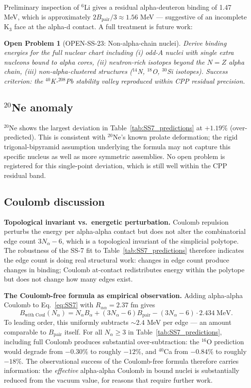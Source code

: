 \documentclass[11pt,letterpaper]{article}
\newtheorem{openproblem}{Open Problem}
\newcommand{\Bpair}{B_{\mathrm{pair}}}
\newcommand{\Balpha}{B_{\alpha}}
\newcommand{\Nalpha}{N_{\alpha}}
\newcommand{\Raa}{R_{\alpha\alpha}}
\begin{document}
Preliminary inspection of ${}^6$Li gives a residual alpha-deuteron binding of 1.47 MeV, which is approximately $2\Bpair/3 \approx 1.56$ MeV --- suggestive of an incomplete K$_3$ face at the alpha-d contact. A full treatment is future work:

\begin{openproblem}[OPEN-SS-23: Non-alpha-chain nuclei]
Derive binding energies for the full nuclear chart including (i) odd-$A$ nuclei with single extra nucleons bound to alpha cores, (ii) neutron-rich isotopes beyond the $N = Z$ alpha chain, (iii) non-alpha-clustered structures (${}^{14}$N, ${}^{18}$O, ${}^{30}$Si isotopes). Success criterion: the ${}^{40}$K-${}^{208}$Pb stability valley reproduced within CPP residual precision.
\end{openproblem}

\subsection{${}^{20}$Ne anomaly}

${}^{20}$Ne shows the largest deviation in Table~\ref{tab:SS7_predictions} at $+1.19\%$ (over-predicted). This is consistent with ${}^{20}$Ne's known prolate deformation; the rigid trigonal-bipyramid assumption underlying the formula may not capture this specific nucleus as well as more symmetric assemblies. No open problem is registered for this single-point deviation, which is still well within the CPP residual band.

\subsection{Coulomb discussion}
\label{sec:coulomb_discussion}

\textbf{Topological invariant vs.~energetic perturbation.} Coulomb repulsion perturbs the energy per alpha-alpha contact but does not alter the combinatorial edge count $3\Nalpha - 6$, which is a topological invariant of the simplicial polytope. The robustness of the SS-7 fit to Table~\ref{tab:SS7_predictions} therefore indicates the edge count is doing real structural work: changes in edge count produce changes in binding; Coulomb at-contact redistributes energy within the polytope but does not change how many edges exist.

\textbf{The Coulomb-free formula as empirical observation.} Adding alpha-alpha Coulomb to Eq.~\ref{eq:SS7} with $\Raa = 2.37$ fm gives
\[
B_{\mathrm{with\;Coul}}(\Nalpha) = \Nalpha \Balpha + (3\Nalpha - 6)\Bpair - (3\Nalpha - 6) \cdot 2.434 \;\mathrm{MeV}.
\]
To leading order, this uniformly subtracts $\sim 2.4$ MeV per edge --- an amount comparable to $\Bpair$ itself. For all $\Nalpha \geq 3$ in Table~\ref{tab:SS7_predictions}, including full Coulomb produces substantial over-subtraction: the ${}^{16}$O prediction would degrade from $-0.30\%$ to roughly $-12\%$, and ${}^{40}$Ca from $-0.84\%$ to roughly $-18\%$. The observational success of the Coulomb-free formula therefore carries information: the \emph{effective} alpha-alpha Coulomb in bound nuclei is substantially reduced from the vacuum value, for reasons that require further work.
\end{document}
